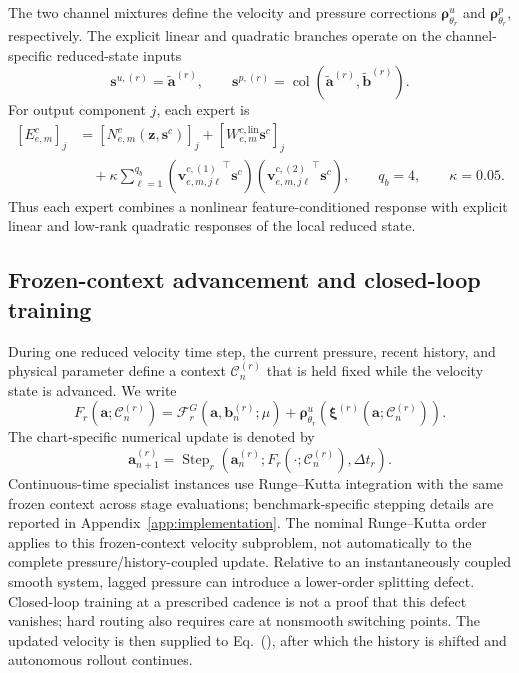The two channel mixtures define the velocity and pressure corrections
$\bm\rho_{\theta_r}^u$ and $\bm\rho_{\theta_r}^p$, respectively. The explicit linear and quadratic branches operate on the channel-specific reduced-state inputs
\begin{equation}
  \bm s^{u,(r)}
  =
  \widetilde{\bm a}^{(r)},
  \qquad
  \bm s^{p,(r)}
  =
  \operatorname{col}
  \left(
    \widetilde{\bm a}^{(r)},
    \widetilde{\bm b}^{(r)}
  \right).
  \label{eq:app_expert_state_slices}
\end{equation}
For output component $j$, each expert is
\begin{align}
  \left[E_{e,m}^c\right]_j
  &=
  \left[
    N_{e,m}^c
    \left(
      \bm z,\bm s^c
    \right)
  \right]_j
  +
  \left[
    W_{e,m}^{c,\mathrm{lin}}
    \bm s^c
  \right]_j
  \nonumber\\
  &\quad+
  \kappa
  \sum_{\ell=1}^{q_b}
  \left(
    {\bm v_{e,m,j\ell}^{c,(1)}}^{\top}
    \bm s^c
  \right)
  \left(
    {\bm v_{e,m,j\ell}^{c,(2)}}^{\top}
    \bm s^c
  \right),
  \qquad
  q_b=4,
  \qquad
  \kappa=0.05.
  \label{eq:app_structured_expert}
\end{align}
Thus each expert combines a nonlinear feature-conditioned response with
explicit linear and low-rank quadratic responses of the local reduced state.


\subsection{Frozen-context advancement and closed-loop training}

During one reduced velocity time step, the current pressure, recent history, and
physical parameter define a context $\mathcal C_n^{(r)}$ that is held fixed
while the velocity state is advanced. We write
\begin{equation}
  F_r
  \left(
    \bm a;\mathcal C_n^{(r)}
  \right)
  =
  \mathcal F_r^G
  \left(
    \bm a,\bm b_n^{(r)};\mu
  \right)
  +
  \bm\rho^u_{\theta_r}
  \left(
    \bm\xi^{(r)}
    \left(
      \bm a;\mathcal C_n^{(r)}
    \right)
  \right).
  \label{eq:app_frozen_context_rhs}
\end{equation}
The chart-specific numerical update is denoted by
\begin{equation}
  \bm a_{n+1}^{(r)}
  =
  \operatorname{Step}_r
  \left(
    \bm a_n^{(r)};
    F_r(\cdot;\mathcal C_n^{(r)}),
    \Delta t_r
  \right).
  \label{eq:app_specialist_step}
\end{equation}
Continuous-time specialist instances use Runge--Kutta integration with the
same frozen context across stage evaluations; benchmark-specific stepping
details are reported in Appendix~\ref{app:implementation}.
The nominal Runge--Kutta order applies to this frozen-context velocity subproblem, not automatically to the complete pressure/history-coupled update. Relative to an instantaneously coupled smooth system, lagged pressure can introduce a lower-order splitting defect. Closed-loop training at a prescribed cadence is not a proof that this defect vanishes; hard routing also requires care at nonsmooth switching points.
The updated velocity is then supplied to
Eq.~(), after which the history is
shifted and autonomous rollout continues.


